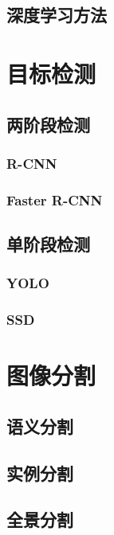 \documentclass[12pt,UTF8]{ctexbook}
\begin{document}
\section{深度学习方法}

\chapter{目标检测}
\label{chap:object_detection}

\section{两阶段检测}

\subsection{R-CNN}

\subsection{Faster R-CNN}

\section{单阶段检测}

\subsection{YOLO}

\subsection{SSD}

\chapter{图像分割}
\label{chap:image_segmentation}

\section{语义分割}

\section{实例分割}

\section{全景分割}
\end{document}
